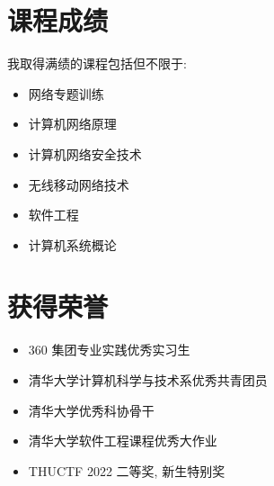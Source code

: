 \documentclass[a4paper, 10pt]{article}
\begin{document}
\noindent
\begin{minipage}[t]{0.48\textwidth}
\section*{课程成绩}
\noindent 我取得满绩的课程包括但不限于:
\begin{itemize}[left=10pt]
    \setlength{\itemsep}{0pt}
    \item 网络专题训练
    \item 计算机网络原理
    \item 计算机网络安全技术
    \item 无线移动网络技术
    \item 软件工程
    \item 计算机系统概论
\end{itemize}
\end{minipage}
\hfill
\begin{minipage}[t]{0.48\textwidth}
\section*{获得荣誉}
\begin{itemize}[left=0pt]
    \setlength{\itemsep}{0pt}
    \item 360 集团专业实践优秀实习生
    \item 清华大学计算机科学与技术系优秀共青团员
    \item 清华大学优秀科协骨干
    \item 清华大学软件工程课程优秀大作业
    \item THUCTF 2022 二等奖, 新生特别奖
\end{itemize}
\end{minipage}

\vspace{1em}
\end{document}
